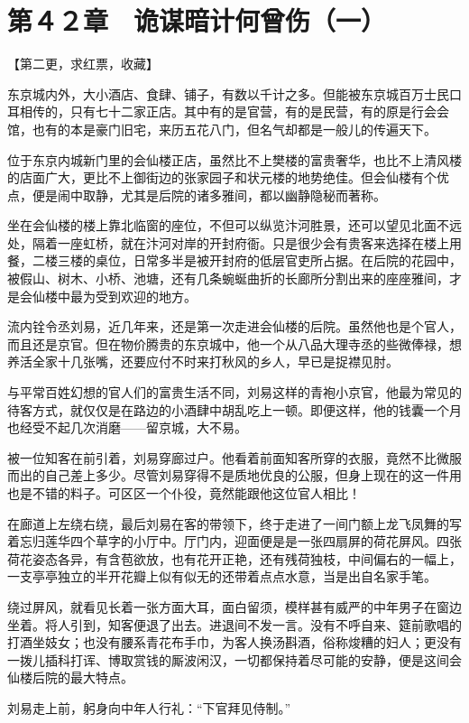 \section{第４２章　诡谋暗计何曾伤（一）}

【第二更，求红票，收藏】

东京城内外，大小酒店、食肆、铺子，有数以千计之多。但能被东京城百万士民口耳相传的，只有七十二家正店。其中有的是官营，有的是民营，有的原是行会会馆，也有的本是豪门旧宅，来历五花八门，但名气却都是一般儿的传遍天下。

位于东京内城新门里的会仙楼正店，虽然比不上樊楼的富贵奢华，也比不上清风楼的店面广大，更比不上御街边的张家园子和状元楼的地势绝佳。但会仙楼有个优点，便是闹中取静，尤其是后院的诸多雅间，都以幽静隐秘而著称。

坐在会仙楼的楼上靠北临窗的座位，不但可以纵览汴河胜景，还可以望见北面不远处，隔着一座虹桥，就在汴河对岸的开封府衙。只是很少会有贵客来选择在楼上用餐，二楼三楼的桌位，日常多半是被开封府的低层官吏所占据。在后院的花园中，被假山、树木、小桥、池塘，还有几条蜿蜒曲折的长廊所分割出来的座座雅间，才是会仙楼中最为受到欢迎的地方。

流内铨令丞刘易，近几年来，还是第一次走进会仙楼的后院。虽然他也是个官人，而且还是京官。但在物价腾贵的东京城中，他一个从八品大理寺丞的些微俸禄，想养活全家十几张嘴，还要应付不时来打秋风的乡人，早已是捉襟见肘。

与平常百姓幻想的官人们的富贵生活不同，刘易这样的青袍小京官，他最为常见的待客方式，就仅仅是在路边的小酒肆中胡乱吃上一顿。即便这样，他的钱囊一个月也经受不起几次消磨——留京城，大不易。

被一位知客在前引着，刘易穿廊过户。他看着前面知客所穿的衣服，竟然不比微服而出的自己差上多少。尽管刘易穿得不是质地优良的公服，但身上现在的这一件用也是不错的料子。可区区一个仆役，竟然能跟他这位官人相比！

在廊道上左绕右绕，最后刘易在客的带领下，终于走进了一间门额上龙飞凤舞的写着忘归莲华四个草字的小厅中。厅门内，迎面便是是一张四扇屏的荷花屏风。四张荷花姿态各异，有含苞欲放，也有花开正艳，还有残荷独枝，中间偏右的一幅上，一支亭亭独立的半开花瓣上似有似无的还带着点点水意，当是出自名家手笔。

绕过屏风，就看见长着一张方面大耳，面白留须，模样甚有威严的中年男子在窗边坐着。将人引到，知客便退了出去。进退间不发一言。没有不呼自来、筵前歌唱的打酒坐妓女；也没有腰系青花布手巾，为客人换汤斟酒，俗称焌糟的妇人；更没有一拨儿插科打诨、博取赏钱的厮波闲汉，一切都保持着尽可能的安静，便是这间会仙楼后院的最大特点。

刘易走上前，躬身向中年人行礼：“下官拜见侍制。”

